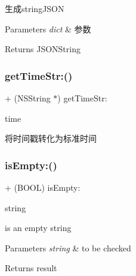 生成string\+J\+S\+ON


\begin{DoxyParams}{Parameters}
{\em dict} & 参数\\
\hline
\end{DoxyParams}
\begin{DoxyReturn}{Returns}
J\+S\+O\+N\+String 
\end{DoxyReturn}
\mbox{\label{category_n_s_string_07_times_08_ae4bb7371e75f904b8c57f8bb3d3e513b}} 
\subsubsection{\texorpdfstring{get\+Time\+Str\+:()}{getTimeStr:()}}
{\footnotesize\ttfamily + (N\+S\+String $\ast$) get\+Time\+Str\+: \begin{DoxyParamCaption}\item[{(N\+S\+String $\ast$)}]{time }\end{DoxyParamCaption}}

将时间戳转化为标准时间 \mbox{\label{category_n_s_string_07_times_08_a692968242e21fe4db53892537e563451}} 
\subsubsection{\texorpdfstring{is\+Empty\+:()}{isEmpty:()}}
{\footnotesize\ttfamily + (B\+O\+OL) is\+Empty\+: \begin{DoxyParamCaption}\item[{(N\+S\+String$\ast$)}]{string }\end{DoxyParamCaption}}

is an empty string


\begin{DoxyParams}{Parameters}
{\em string} & to be checked \\
\hline
\end{DoxyParams}
\begin{DoxyReturn}{Returns}
result 
\end{DoxyReturn}
\mbox{\label{category_n_s_string_07_times_08_a22934297252e64c305389e97eb4319d7}} 
